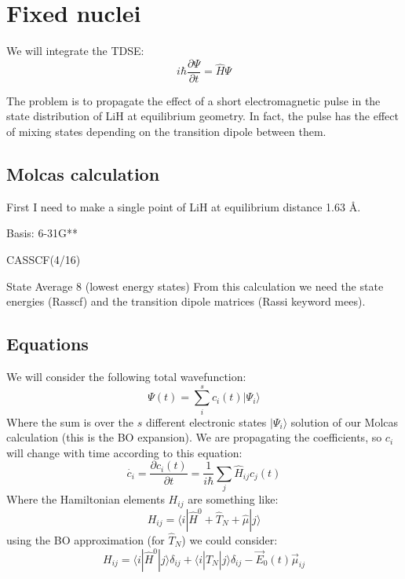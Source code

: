 \section{Fixed nuclei}
We will integrate the TDSE:
\begin{equation}\label{tdse}
i\hbar \dfrac{\partial\Psi}{\partial t} = \hat{H} \Psi
\end{equation}

The problem is to propagate the effect of a short electromagnetic pulse in the state distribution of LiH at equilibrium geometry. In fact, the pulse has the effect of mixing states depending on the transition dipole between them.

\subsection{Molcas calculation}
First I need to make a single point of LiH at equilibrium distance 1.63 \AA.
\bee
\item Basis: 6-31G**
\item CASSCF(4/16)
\item State Average 8 (lowest energy states)
\ee
{}
From this calculation we need the state energies (Rasscf) and the transition dipole matrices (Rassi keyword mees).



\subsection{Equations}
We will consider the following total wavefunction:
\begin{equation}\label{boexp}
\Psi(t) = \sum^{s}_i c_i(t) |\Psi_i\rangle
\end{equation}
Where the sum is over the $s$ different electronic states $|\Psi_i\rangle$ solution of our Molcas calculation (this is the BO expansion). We are propagating the coefficients, so $c_i$ will change with time according to this equation:
\begin{equation}\label{ctdse}
\dot{c_i}=\dfrac{\partial c_i(t)}{\partial t} = \dfrac{1}{i\hbar} \sum_j \hat{H}_{ij} c_j(t)
\end{equation}
Where the Hamiltonian elements $H_{ij}$ are something like:
\begin{equation}\label{hami1}
H_{ij} = \langle i|\hat{H}^0 + \hat{T}_N + \hat{\mu}|j\rangle
\end{equation}
using the BO approximation (for $\hat{T}_N$) we could consider:
\begin{equation}\label{hami2}
H_{ij} = \langle i|\hat{H}^0|j\rangle \delta_{ij} + \langle i| \hat{T}_N |j\rangle \delta_{ij} - \vec{E}_0(t) \vec{\mu}_{ij}
\end{equation}

